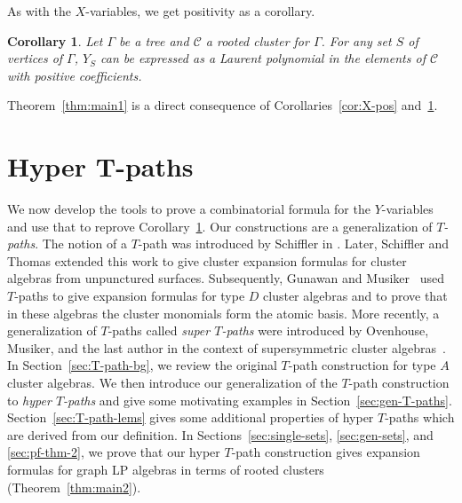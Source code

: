 \documentclass[pdftex]{sigma}
\numberwithin{equation}{section}
\newtheorem{Corollary}[Theorem]{Corollary}
\begin{document}
As with the $X$-variables, we get positivity as a corollary.
\begin{Corollary}\label{cor:Y-pos}
Let $\Gamma$ be a tree and $\mathcal{C}$ a rooted cluster for $\Gamma$. For any set $S$ of vertices of $\Gamma$, $Y_S$ can be expressed as a Laurent polynomial in the elements of $\mathcal{C}$ with positive coefficients.
\end{Corollary}
Theorem~\ref{thm:main1} is a direct consequence of Corollaries~\ref{cor:X-pos} and~\ref{cor:Y-pos}.
\section[Hyper T-paths]{Hyper $\boldsymbol{T}$-paths}\label{sec:T-path}
We now develop the tools to prove a combinatorial formula for the $Y$-variables and use that to reprove Corollary~\ref{cor:Y-pos}. Our constructions are a generalization of \emph{$T$-paths}.
The notion of a $T$-path was introduced by Schiffler in \cite{S-08}. Later, Schiffler and Thomas \cite{S-10, ST-09} extended this work to give cluster expansion formulas for cluster algebras from unpunctured surfaces. Subsequently, Gunawan and Musiker~\cite{GM-15} used $T$-paths to give expansion formulas for type $D$ cluster algebras and to prove that in these algebras the cluster monomials form the atomic basis. More recently, a generalization of $T$-paths called \emph{super $T$-paths} were introduced by Ovenhouse, Musiker, and the last author in the context of supersymmetric cluster algebras~\cite{MOZ-21}.
In Section~\ref{sec:T-path-bg}, we review the original $T$-path construction for type $A$ cluster algebras. We then introduce our generalization of the $T$-path construction to \emph{hyper $T$-paths}
and give some motivating examples in Section~\ref{sec:gen-T-paths}. Section~\ref{sec:T-path-lems} gives some additional properties of hyper $T$-paths which are derived from our definition. In Sections~\ref{sec:single-sets}, \ref{sec:gen-sets}, and \ref{sec:pf-thm-2}, we prove that our hyper $T$-path construction gives expansion formulas for graph LP algebras in terms of rooted clusters (Theorem~\ref{thm:main2}).
\end{document}
